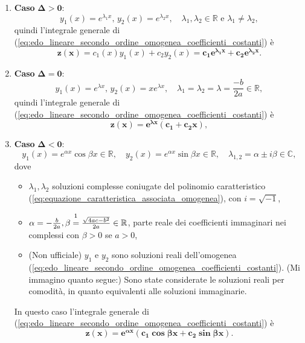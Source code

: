 \begin{enumerate}
	\item \textbf{Caso} $\boldsymbol{\Delta>0}$:
	\begin{equation}\label{eq:soluzioni_omogenea_secondo_grado_delta_negativa}
		y_1(x) = e^{\lambda_1 x},\, y_2(x) = e^{\lambda_2 x},\quad \lambda_1,\lambda_2\in\mathbb{R}\text{ e } \lambda_1\neq\lambda_2,
	\end{equation}
	quindi l'integrale generale di (\ref{eq:edo_lineare_secondo_ordine_omogenea_coefficienti_costanti}) è
	\begin{equation}\label{eq:integrale_generale_edo_lineare_secondo_ordine_omogenea_coefficienti_costanti_Delta_>_0}
		\boldsymbol{z(x)} = c_1 (x)y_1(x)+ c_2y_2(x) = \boldsymbol{c_1 e^{\lambda_1 x} + c_2 e^{\lambda_2 x}}.
	\end{equation}
	\item \textbf{Caso} $\boldsymbol{\Delta = 0}$:
	\begin{equation}\label{eq:soluzioni_omogenea_secondo_grado_delta_zero}
		y_1(x) = e^{\lambda x},\, y_2(x)=x e^{\lambda x},\quad \lambda_1=\lambda_2=\lambda=\frac{-b}{2a}\in\mathbb{R},
	\end{equation}
	quindi l'integrale generale di (\ref{eq:edo_lineare_secondo_ordine_omogenea_coefficienti_costanti}) è
	\begin{equation}\label{eq:integrale_generale_edo_lineare_secondo_ordine_omogenea_coefficienti_costanti_Delta_=_0}
		\boldsymbol{z(x) = e^{\lambda x}(c_1+c_2 x)}, 
	\end{equation}
	\item \textbf{Caso} $\boldsymbol{\Delta<0}$:
	\begin{equation}\label{eq:soluzioni_omogenea_secondo_grado_delta_positiva}
		y_1(x) = e^{\alpha x}\cos\beta x\in\mathbb{R},\quad y_2(x) = e^{\alpha x} \sin\beta x\in\mathbb{R},\quad \lambda_{1,2}=\alpha \pm i \beta\in\mathbb{C},
	\end{equation}
	dove
	\begin{itemize}
		\item $\lambda_1,\lambda_2$ \gls{soluzioni complesse coniugate} del polinomio caratteristico (\ref{eq:equazione_caratteristica_associata_omogenea}), con $i=\sqrt{-1}$,
		\item $\alpha = -\frac{b}{2a}, \beta\overset{\footnotemark}{=}\frac{\sqrt{4ac-b^2}}{2a}\in\mathbb{R}$, parte reale dei coefficienti immaginari nei complessi con $\beta>0$ se $a>0$,
		\item (Non ufficiale) $y_1$ e $y_2$ sono soluzioni reali dell'omogenea (\ref{eq:edo_lineare_secondo_ordine_omogenea_coefficienti_costanti}). (Mi immagino quanto segue:) Sono state considerate le soluzioni reali per comodità, in quanto equivalenti alle soluzioni immaginarie.
	\end{itemize}
	In questo caso l'integrale generale di (\ref{eq:edo_lineare_secondo_ordine_omogenea_coefficienti_costanti}) è
	\begin{equation}\label{eq:integrale_generale_edo_lineare_secondo_ordine_omogenea_coefficienti_costanti_Delta_<_0}
		\boldsymbol{z(x) = e^{\alpha x}(c_1\cos\beta x + c_2\sin\beta x)}.
	\end{equation}
\end{enumerate}

